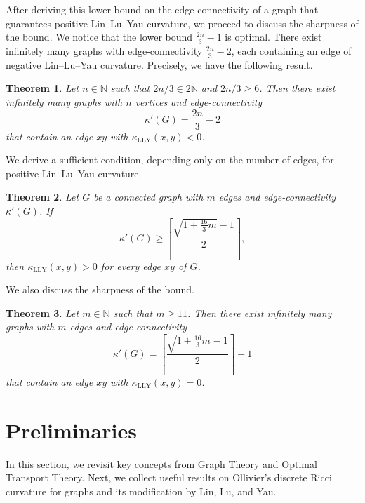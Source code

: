 \documentclass[11pt,bezier]{article}
\newtheorem{theorem}{Theorem}[section]
\theoremstyle{definition}
\theoremstyle{definition}
\theoremstyle{nonumber}
\begin{document}
After deriving this lower bound on the edge-connectivity of a graph that guarantees positive Lin--Lu--Yau curvature, we proceed to discuss the sharpness of the bound.
We notice that the lower bound $\frac{2n}{3}-1$ is optimal. There exist infinitely many graphs with edge-connectivity $\frac{2n}{3}-2$, each containing an edge of negative Lin--Lu--Yau curvature. Precisely, we have the following result.

\begin{theorem}\label{n bound sharpness}
Let $n \in \mathbb{N}$ such that $2n/3 \in 2\mathbb{N}$ and $2n/3 \geq 6$. Then there exist infinitely many graphs with $n$ vertices and edge-connectivity 
$$
\kappa'(G) = \frac{2n}{3} - 2
$$ 
that contain an edge $xy$ with $\kappa_{\mathrm{LLY}}(x, y) < 0$.
\end{theorem}

We derive a sufficient condition, depending only on the number of edges, for positive Lin--Lu--Yau curvature.

\begin{theorem}\label{m bound}
Let $G$ be a connected graph with $m$ edges and edge-connectivity $\kappa'(G)$. If $$
\kappa'(G)\ge \left\lceil\frac{\sqrt{1+\frac{16}{3}m}-1}{2}
\right\rceil,
$$ 
then $\kappa_{\mathrm{LLY}}(x,y)>0$ for every edge $xy$ of $G$.
\end{theorem}

We also discuss the sharpness of the bound.

\begin{theorem}\label{m bound sharpness}
Let $m \in \mathbb{N}$ such that $m \geq 11$. Then there exist infinitely many graphs with $m$ edges and edge-connectivity 
$$
\kappa'(G)=\left\lceil\frac{\sqrt{1+\frac{16}{3}m}-1}{2}\right\rceil-1
$$ 
that contain an edge $xy$ with $\kappa_{\mathrm{LLY}}(x, y) = 0$.
\end{theorem}

\section{Preliminaries}

In this section, we revisit key concepts from Graph Theory and Optimal Transport Theory.
Next, we collect useful results on Ollivier’s discrete Ricci curvature for graphs and its modification by Lin, Lu, and Yau.
\end{document}
